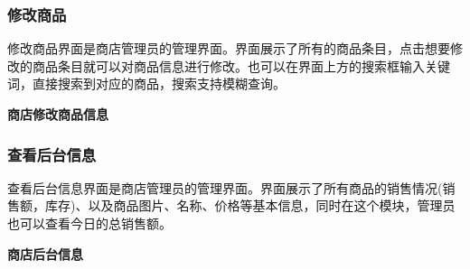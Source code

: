 \documentclass{article}
\begin{document}
\subsubsection{修改商品}

修改商品界面是商店管理员的管理界面。界面展示了所有的商品条目，点击想要修改的商品条目就可以对商品信息进行修改。也可以在界面上方的搜索框输入关键词，直接搜索到对应的商品，搜索支持模糊查询。

\begin{center}
\textbf{商店修改商品信息}
\end{center}


\subsubsection{查看后台信息}
查看后台信息界面是商店管理员的管理界面。界面展示了所有商品的销售情况(销售额，库存)、以及商品图片、名称、价格等基本信息，同时在这个模块，管理员也可以查看今日的总销售额。



\begin{center}
\textbf{商店后台信息}
\end{center}
\end{document}
